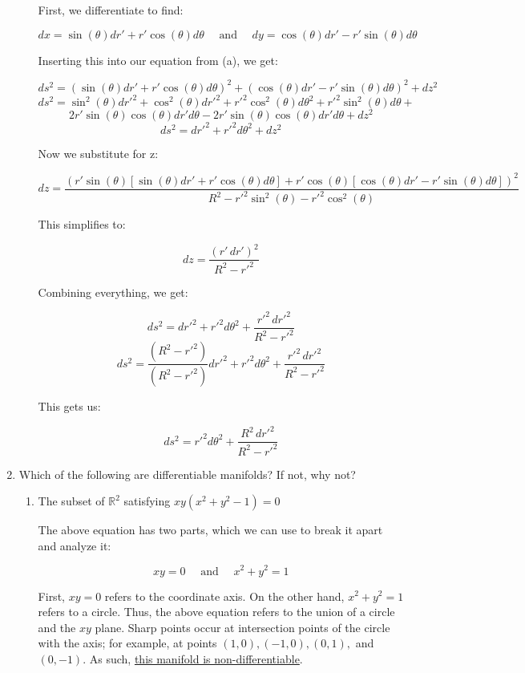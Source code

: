\begin{enumerate}
\begin{enumerate}
        First, we differentiate to find:

        $$dx=\sin(\theta)dr\prime+r\prime\cos(\theta)d\theta\quad\text{ and }\quad dy=\cos(\theta)dr\prime-r\prime\sin(\theta)d\theta$$

        Inserting this into our equation from (a), we get:

        $$ds^2=(\sin(\theta)dr\prime+r\prime\cos(\theta)d\theta)^2+(\cos(\theta)dr\prime-r\prime\sin(\theta)d\theta)^2+dz^2$$
        $$ds^2=\sin^2(\theta)dr\prime^2+\cos^2(\theta)dr\prime^2+r\prime^2\cos^2(\theta)d\theta^2+r\prime^2\sin^2(\theta)d\theta+$$
        $$2r\prime\sin(\theta)\cos(\theta)dr\prime d\theta-2r\prime\sin(\theta)\cos(\theta)dr\prime d\theta+dz^2$$
        $$ds^2=dr\prime^2+r\prime^2d\theta^2+dz^2$$

        Now we substitute for z:

        $$dz=\frac{(r\prime\sin(\theta)[\sin(\theta)dr\prime+r\prime\cos(\theta)d\theta]+r\prime\cos(\theta)[\cos(\theta)dr\prime-r\prime\sin(\theta)d\theta])^2}{R^2-r\prime^2\sin^2(\theta)-r\prime^2\cos^2(\theta)}$$

        This simplifies to:

        $$dz=\frac{(r\prime\,dr\prime)^2}{R^2-r\prime^2}$$

        Combining everything, we get:

        $$ds^2=dr\prime^2+r\prime^2d\theta^2+\frac{r\prime^2\,dr\prime^2}{R^2-r\prime^2}$$
        $$ds^2=\frac{(R^2-r\prime^2)}{(R^2-r\prime^2)}dr\prime^2+r\prime^2d\theta^2+\frac{r\prime^2\,dr\prime^2}{R^2-r\prime^2}$$

        This gets us:

        $$\boxed{ds^2=r\prime^2d\theta^2+\frac{R^2\,dr\prime^2}{R^2-r\prime^2}}$$

    \end{enumerate}

  \item Which of the following are differentiable manifolds? If not, why not?

    \begin{enumerate}

      \item The subset of $\mathbb{R}^2$ satisfying $xy(x^2 + y^2 - 1) = 0$

        The above equation has two parts, which we can use to break it apart and analyze it:

        $$xy=0\quad\text{ and }\quad x^2+y^2=1$$

        First, $xy=0$ refers to the coordinate axis. On the other hand, $x^2+y^2=1$ refers to a circle. Thus, the above equation refers to the union of a circle and the $xy$ plane. Sharp points occur at intersection points of the circle with the axis; for example, at points $(1,0), (-1,0), (0,1),$ and $(0,-1)$. As such, \underline{this manifold is non-differentiable}.


\end{enumerate}
\end{enumerate}
